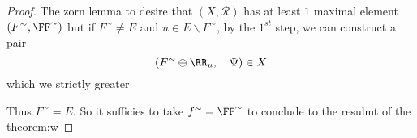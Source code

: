 \begin{theorem}
\begin{proof}
		 The zorn lemma to desire that 
		 $(X, \mathcal{R} )  $  has at least $1$ maximal
		 element $(F^{\sim}, \FF ^{\sim})  $  
		 but if $F^{\sim} \neq E $  
		 and $u \in  E \backslash F^{\sim} $, by the 
		 $1^{st} $  
		 step, we can construct a pair 
		 \[
			 ( F^{\sim} \oplus \RR _{u} , \quad \Psi )  \in 
			 X
		 \]
		 which we strictly greater 



		 Thus $F^{\sim} = E $. So it sufficies to take $f^{\sim} = 
		 \FF ^{\sim}$  to conclude to the resulmt of the theorem:w
		 
	 \end{proof}
\end{theorem} 


% 
